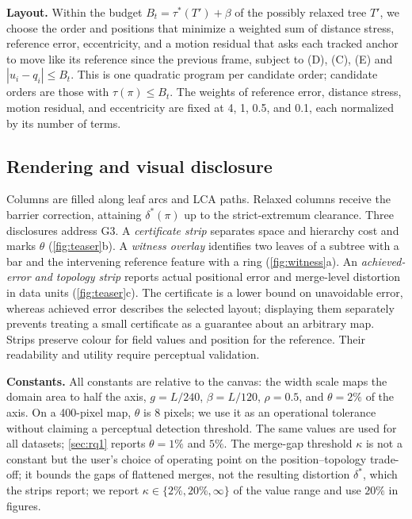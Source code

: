 \documentclass[review]{vgtc}                 %
\begin{document}
\textbf{Layout.} Within the budget $B_t=\tau^*(T')+\beta$ of the possibly relaxed tree $T'$, we choose the order and positions that minimize a weighted sum of distance stress, reference error, eccentricity, and a motion residual that asks each tracked anchor to move like its reference since the previous frame, subject to (D), (C), (E) and $|u_i-q_i|\le B_t$. This is one quadratic program per candidate order; candidate orders are those with $\tau(\pi)\le B_t$. The weights of reference error, distance stress, motion residual, and eccentricity are fixed at 4, 1, 0.5, and 0.1, each normalized by its number of terms.

\subsection{Rendering and visual disclosure}
Columns are filled along leaf arcs and LCA paths. Relaxed columns receive the barrier correction, attaining $\delta^*(\pi)$ up to the strict-extremum clearance. Three disclosures address G3. A \emph{certificate strip} separates space and hierarchy cost and marks $\theta$ (\cref{fig:teaser}b). A \emph{witness overlay} identifies two leaves of a subtree with a bar and the intervening reference feature with a ring (\cref{fig:witness}a). An \emph{achieved-error and topology strip} reports actual positional error and merge-level distortion in data units (\cref{fig:teaser}c). The certificate is a lower bound on unavoidable error, whereas achieved error describes the selected layout; displaying them separately prevents treating a small certificate as a guarantee about an arbitrary map. Strips preserve colour for field values and position for the reference. Their readability and utility require perceptual validation.

\textbf{Constants.} All constants are relative to the canvas: the width scale maps the domain area to half the axis, $g=L/240$, $\beta=L/120$, $\rho=0.5$, and $\theta=2\%$ of the axis. On a 400-pixel map, $\theta$ is 8 pixels; we use it as an operational tolerance without claiming a perceptual detection threshold. The same values are used for all datasets; \cref{sec:rq1} reports $\theta=1\%$ and $5\%$. The merge-gap threshold $\kappa$ is not a constant but the user's choice of operating point on the position--topology trade-off; it bounds the gaps of flattened merges, not the resulting distortion $\delta^*$, which the strips report; we report $\kappa\in\{2\%,20\%,\infty\}$ of the value range and use $20\%$ in figures.
\end{document}
